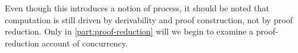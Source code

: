 


Even though this  introduces a notion of process, it should be noted that computation is still driven by derivability and proof construction, not by proof reduction.
Only in \cref{part:proof-reduction} will we begin to examine a proof-reduction account of concurrency.









